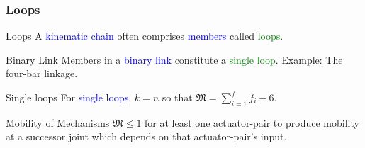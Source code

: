 \begin{frame}
	\frametitle{Loops}	
	\begin{block}{Loops}
		A \textcolor{blue}{kinematic chain} often comprises \textcolor{blue}{members} called \textcolor{green}{loops}. 
	\end{block}
	
	\begin{block}{Binary Link}
		Members in a \textcolor{blue}{binary link} constitute a \textcolor{green}{single loop}. Example: The four-bar linkage. 
	\end{block}	
	
	\begin{block}{Single loops}
		For \textcolor{blue}{single loops}, $k=n$ so that $\mathfrak{M}=\sum_{i=1}^{f} f_i - 6$. 
	\end{block}
	
	\begin{block}{Mobility of Mechanisms}
		$\mathfrak{M}\le 1$ for at least one actuator-pair to produce mobility at a successor joint which depends on that actuator-pair's input. 
	\end{block}
\end{frame}


